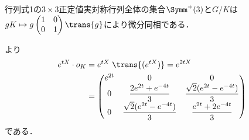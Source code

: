 \begin{npfwn}
  行列式1の$3\times 3$正定値実対称行列全体の集合$\Symm^{+}(3)$と$G/K$は$gK \mapsto g
  \begin{pmatrix}
    1 & 0\\ 0 & 1
  \end{pmatrix}
  \trans{g} $により微分同相である．
  
  より
  \begin{align}
    e^{tX}\cdot o_K &= e^{tX}\; \trans{(e^{tX})} = e^{2tX}\notag\\
                    &= \begin{pmatrix}
                      e^{2t} & 0 & 0 \\
                      0 & \dfrac{2e^{2t} + e^{-4t}}{3} &  \dfrac{\sqrt{2} (e^{2t} - e^{-4t})}{3}\\
                      0 & \dfrac{\sqrt{2} (e^{2t} - e^{-4t})}{3} & \dfrac{e^{2t} + 2e^{-4t}}{3}
                    \end{pmatrix}\label{eq:0114-1}
  \end{align}
  である．


\end{npfwn}
